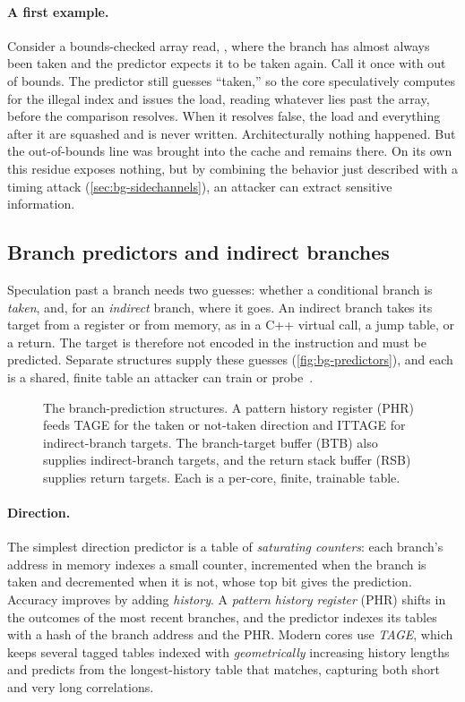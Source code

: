 \paragraph{A first example.}
Consider a bounds-checked array read, , where the branch has almost
always been taken and the predictor expects it to be taken again. Call it once with 
out of bounds. The predictor still guesses ``taken,'' so the core speculatively computes
 for the illegal index and issues the load, reading whatever lies past the array, before
the comparison  resolves. When it resolves false, the load and everything after it are
squashed and  is never written. Architecturally nothing happened. But the out-of-bounds
line  was brought into the cache and remains there. On its own this residue exposes
nothing, but by combining the behavior just described with a timing attack
(\autoref{sec:bg-sidechannels}), an attacker can extract sensitive information.

\subsection{Branch predictors and indirect branches}
\label{sec:bg-predictors}

Speculation past a branch needs two guesses: whether a conditional branch is \emph{taken}, and, for
an \emph{indirect} branch, where it goes. An indirect branch takes its target from a register or
from memory, as in a C++ virtual call, a jump table, or a return. The target is therefore not
encoded in the instruction and must be predicted. Separate structures supply these guesses
(\autoref{fig:bg-predictors}), and each is a shared, finite table an attacker can train or
probe~\cite{bunnyhop,branchscope}.

\begin{figure}[t]
\centering
\fitwidth{}
\caption{The branch-prediction structures. A pattern history register (PHR) feeds TAGE for the
taken or not-taken direction and ITTAGE for indirect-branch targets. The branch-target buffer
(BTB) also supplies indirect-branch targets, and the return stack buffer (RSB) supplies return
targets. Each is a per-core, finite, trainable table.}
\label{fig:bg-predictors}
\end{figure}

\paragraph{Direction.} The simplest direction predictor is a table of \emph{saturating counters}:
each branch's address in memory indexes a small counter, incremented when the branch is taken and
decremented when it is not, whose top bit gives the prediction. Accuracy improves by adding \emph{history}. A \emph{pattern history
register} (PHR) shifts in the outcomes of the most recent branches, and the predictor indexes its
tables with a hash of the branch address and the PHR. Modern cores use \emph{TAGE}, which keeps
several tagged tables indexed with \emph{geometrically} increasing history lengths and predicts from
the longest-history table that matches, capturing both short and very long correlations.

